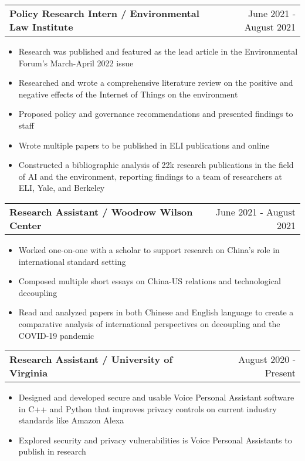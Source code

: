 \documentclass[letterpaper,11pt]{article}
\makeatletter
\newcommand{\resumeItem}[1]{
  \item\small{
    {#1} \vspace{-2pt}
  }
}
\newcommand{\resumeSubheadingTwo}[2]{
  \vspace{-1pt}\item
    \begin{tabular*}{0.97\textwidth}{l@{\extracolsep{\fill}}r}
      \textbf{#1} & #2 \\
    \end{tabular*}\vspace{-5pt}
}
\newcommand{\resumeItemListStart}{\begin{itemize}}
\newcommand{\resumeItemListEnd}{\end{itemize}\vspace{-5pt}}
\makeatother
\begin{document}
    \resumeSubheadingTwo
      {Policy Research Intern / Environmental Law Institute}{June 2021 - August 2021}
      \resumeItemListStart
        \resumeItem{Research was published and featured as the lead article in the Environmental Forum's March-April 2022 issue}
        \resumeItem{Researched and wrote a comprehensive literature review on the positive and negative effects of the Internet of Things on the environment}
        \resumeItem{Proposed policy and governance recommendations and presented findings to staff}
        \resumeItem{Wrote multiple papers to be published in ELI publications and online}
        \resumeItem{Constructed a bibliographic analysis of 22k research publications in the field of AI and the environment, reporting findings to a team of researchers at ELI, Yale, and Berkeley}
      \resumeItemListEnd

    \resumeSubheadingTwo
      {Research Assistant / Woodrow Wilson Center}{June 2021 - August 2021}
      \resumeItemListStart
        \resumeItem{Worked one-on-one with a scholar to support research on China's role in international standard setting}
        \resumeItem{Composed multiple short essays on China-US relations and technological decoupling}
        \resumeItem{Read and analyzed papers in both Chinese and English language to create a comparative analysis of international perspectives on decoupling and the COVID-19 pandemic}
      \resumeItemListEnd

    \resumeSubheadingTwo
      {Research Assistant / University of Virginia}{August 2020 - Present}
      \resumeItemListStart
        \resumeItem{Designed and developed secure and usable Voice Personal Assistant software in C++ and Python that improves privacy controls on current industry standards like Amazon Alexa}
        \resumeItem{Explored security and privacy vulnerabilities is Voice Personal Assistants to publish in research}
      \resumeItemListEnd

      
\end{document}
